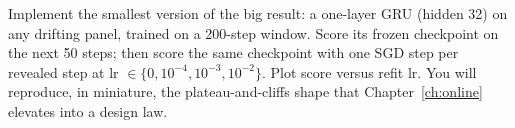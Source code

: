 \begin{drillbox}
Implement the smallest version of the big result: a one-layer GRU (hidden
32) on any drifting panel, trained on a 200-step window. Score its frozen
checkpoint on the next 50 steps; then score the same checkpoint with one
SGD step per revealed step at lr $\in \{0, 10^{-4}, 10^{-3}, 10^{-2}\}$.
Plot score versus refit lr. You will reproduce, in miniature, the
plateau-and-cliffs shape that Chapter~\ref{ch:online} elevates into a
design law.
\end{drillbox}
